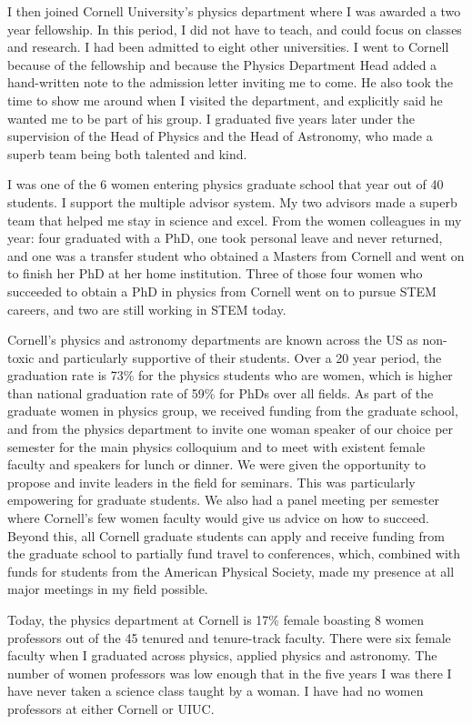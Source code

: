 \documentclass[utf8]{frontiersSCNS} %
\begin{document}
I then joined Cornell University's physics department where I was awarded a two year fellowship. In this period, I did not have to teach, and could focus on classes and research. I had been admitted to eight other universities. I went to Cornell because of the fellowship and because the Physics Department Head added a hand-written note to the admission letter inviting me to come. He also took the time to show me around when I visited the department, and explicitly said he wanted me to be part of his group.  I graduated five years later under the supervision of the Head of Physics and the Head of Astronomy, who made a superb team being both talented and kind.

I was one of the 6 women entering physics graduate school that year out of 40 students. I support the multiple advisor system. My two advisors made a superb team that helped me stay in science and excel. From the women colleagues in my year: four graduated with a PhD, one took personal leave and never returned, and one was a transfer student who obtained a Masters from Cornell and went on to finish her PhD at her home institution. Three of those four women who succeeded to obtain a PhD in physics from Cornell went on to pursue STEM careers, and two are still working in STEM today. 

Cornell's physics and astronomy departments are known across the US as non-toxic and particularly supportive of their students. Over a 20 year period, the graduation rate is 73\% for the physics students who are women, which is higher than national graduation rate of 59\% for PhDs over all fields. As part of the graduate women in physics group, we received funding from the graduate school, and from the physics department to invite one woman speaker of our choice per semester for the main physics colloquium and to meet with existent female faculty and speakers for lunch or dinner. We were given the opportunity to propose and invite leaders in the field for seminars. This was particularly empowering for graduate students. We also had a panel meeting per semester where Cornell's few women faculty would give us advice on how to succeed.  Beyond this, all Cornell graduate students can apply and receive funding from the graduate school to partially fund travel to conferences, which, combined with funds for students from the American Physical Society, made my presence at all major meetings in my field possible. 

Today, the physics department at Cornell is 17\% female boasting 8 women professors out of the 45 tenured and tenure-track faculty. There were six female faculty when I graduated across physics, applied physics and astronomy. The number of women professors was low enough that in the five years I was there I have never taken a science class taught by a woman. I have had no women professors at either Cornell or UIUC. 
\end{document}
